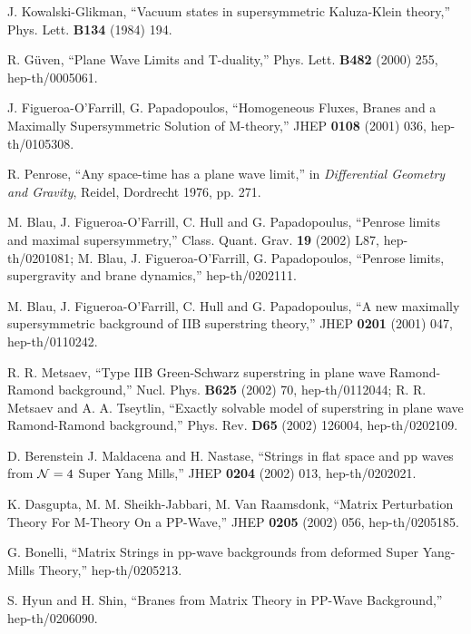 \documentclass[a4paper,12pt]{article}
\begin{document}
\newpage
\begin{thebibliography}{99}
  
 J. Kowalski-Glikman, ``Vacuum states in
  supersymmetric Kaluza-Klein theory,'' Phys. Lett. {\bf B134} (1984)
  194.

 R. G\"{u}ven, ``Plane Wave Limits and T-duality,''
  Phys. Lett. {\bf B482} (2000) 255, hep-th/0005061.

 J. Figueroa-O'Farrill, G. Papadopoulos, ``Homogeneous
  Fluxes, Branes and a Maximally Supersymmetric Solution of
  M-theory,'' JHEP {\bf 0108} (2001) 036, hep-th/0105308.

 R. Penrose, ``Any space-time has a plane wave
  limit,'' in {\it Differential Geometry and Gravity}, Reidel,
  Dordrecht 1976, pp. 271.
  
 M. Blau, J. Figueroa-O'Farrill, C. Hull and G.
  Papadopoulus, ``Penrose limits and maximal supersymmetry,'' Class.
  Quant. Grav. {\bf 19} (2002) L87, hep-th/0201081; M. Blau, J.
  Figueroa-O'Farrill, G. Papadopoulos, ``Penrose limits, supergravity
  and brane dynamics,'' hep-th/0202111.

 M. Blau, J. Figueroa-O'Farrill, C. Hull and G.
  Papadopoulus, ``A new maximally supersymmetric background of IIB
  superstring theory,'' JHEP {\bf 0201} (2001) 047, hep-th/0110242.

 R. R. Metsaev, ``Type IIB Green-Schwarz superstring
in plane wave Ramond-Ramond background,'' Nucl. Phys.  {\bf B625}
(2002) 70, hep-th/0112044; R. R. Metsaev and A. A. Tseytlin, ``Exactly
solvable model of superstring in plane wave Ramond-Ramond
background,'' Phys.  Rev. {\bf D65} (2002) 126004, hep-th/0202109.

 D. Berenstein J. Maldacena and H. Nastase, ``Strings
  in flat space and pp waves from ${\cal N} = 4$ Super Yang Mills,''
  JHEP {\bf 0204} (2002) 013, hep-th/0202021.

 K. Dasgupta, M. M. Sheikh-Jabbari, M. Van Raamsdonk,
  ``Matrix Perturbation Theory For M-Theory On a PP-Wave,'' JHEP {\bf
    0205} (2002) 056, hep-th/0205185.

 G. Bonelli, ``Matrix Strings in pp-wave backgrounds
from deformed Super Yang-Mills Theory,'' hep-th/0205213.

 S. Hyun and H. Shin, ``Branes from Matrix Theory in
  PP-Wave Background,'' hep-th/0206090.
  

\end{thebibliography}
\end{document}
